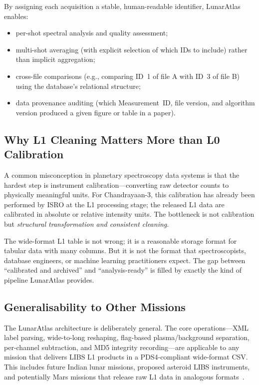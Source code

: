 \documentclass[a4paper,twocolumn,10pt]{article}
\begin{document}
By assigning each acquisition a stable, human-readable identifier,
LunarAtlas enables:
\begin{itemize}[nosep,leftmargin=*]
  \item per-shot spectral analysis and quality assessment;
  \item multi-shot averaging (with explicit selection of which IDs to
    include) rather than implicit aggregation;
  \item cross-file comparisons (e.g., comparing ID~1 of file A with
    ID~3 of file B) using the database's relational structure;
  \item data provenance auditing (which Measurement~ID, file version,
    and algorithm version produced a given figure or table in a paper).
\end{itemize}

\subsection{Why L1 Cleaning Matters More than L0 Calibration}

A common misconception in planetary spectroscopy data systems is that
the hardest step is instrument calibration---converting raw detector
counts to physically meaningful units.  For Chandrayaan-3, this
calibration has already been performed by ISRO at the L1 processing
stage; the released L1 data are calibrated in absolute or relative
intensity units.  The bottleneck is not calibration but
\emph{structural transformation and consistent cleaning}.

The wide-format L1 table is not wrong; it is a reasonable storage
format for tabular data with many columns.  But it is not the format
that spectroscopists, database engineers, or machine learning
practitioners expect.  The gap between ``calibrated and archived'' and
``analysis-ready'' is filled by exactly the kind of pipeline LunarAtlas
provides.

\subsection{Generalisability to Other Missions}

The LunarAtlas architecture is deliberately general.  The core
operations---XML label parsing, wide-to-long reshaping, flag-based
plasma/background separation, per-channel subtraction, and MD5
integrity recording---are applicable to any mission that delivers LIBS
L1 products in a PDS4-compliant wide-format CSV.  This includes future
Indian lunar missions, proposed asteroid LIBS instruments, and
potentially Mars missions that release raw L1 data in analogous
formats~\cite{Saeidfirozeh2024}.
\end{document}

